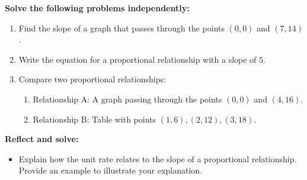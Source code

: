 \documentclass[12pt]{article}
\begin{document}
\begin{tcolorbox}[colframe=black!60, colback=white, 
coltitle=black, colbacktitle=black!15, fonttitle=\bfseries\Large, 
title=Independent Practice, halign title=center, left=10pt, right=10pt, top=10pt, bottom=15pt]
\textbf{Solve the following problems independently:}
\begin{enumerate}[itemsep=5em]
    \item Find the slope of a graph that passes through the points \((0, 0)\) and \((7, 14)\).
    \item Write the equation for a proportional relationship with a slope of \(5\).
    \item Compare two proportional relationships:
    \begin{enumerate}
        \item Relationship A: A graph passing through the points \((0, 0)\) and \((4, 16)\).
        \item Relationship B: Table with points \((1, 6), (2, 12), (3, 18)\).
    \end{enumerate}
\end{enumerate}
\end{tcolorbox}

\vspace{1em}

\begin{tcolorbox}[colframe=black!60, colback=white, 
coltitle=black, colbacktitle=black!15, fonttitle=\bfseries\Large, 
title=Exit Ticket, halign title=center, left=10pt, right=10pt, top=10pt, bottom=15pt]
\textbf{Reflect and solve:}
\begin{itemize}
    \item Explain how the unit rate relates to the slope of a proportional relationship. Provide an example to illustrate your explanation.
\end{itemize}
\end{tcolorbox}
\end{document}
